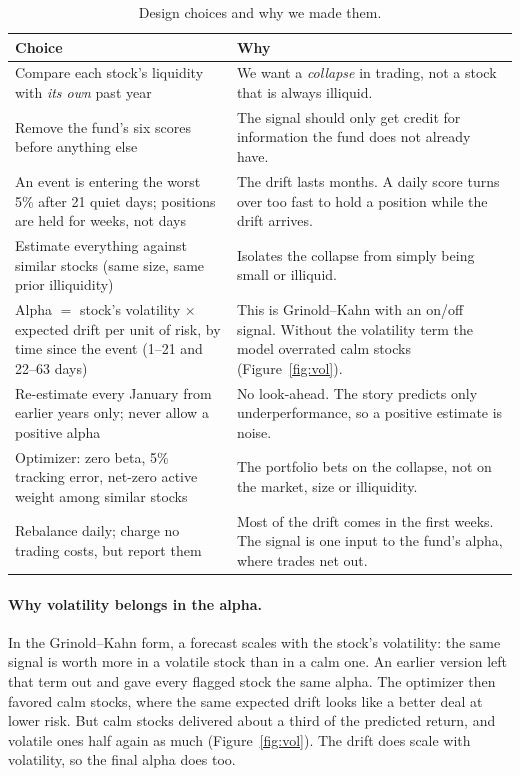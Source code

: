 \documentclass[11pt]{article}
\begin{document}
\begin{table}[H]
\centering
\caption{Design choices and why we made them.}\label{tab:choices}
\small
\begin{tabularx}{\textwidth}{p{}X}
\toprule
Choice & Why \\
\midrule
Compare each stock's liquidity with \emph{its own} past year &
  We want a \emph{collapse} in trading, not a stock that is always illiquid. \\
Remove the fund's six scores before anything else &
  The signal should only get credit for information the fund does not already have. \\
An event is entering the worst 5\% after 21 quiet days; positions are held for weeks, not days &
  The drift lasts months. A daily score turns over too fast to hold a position while the drift arrives. \\
Estimate everything against similar stocks (same size, same prior illiquidity) &
  Isolates the collapse from simply being small or illiquid. \\
Alpha $=$ stock's volatility $\times$ expected drift per unit of risk, by time since the event (1--21 and 22--63 days) &
  This is Grinold--Kahn with an on/off signal. Without the volatility term the model overrated calm stocks (Figure~\ref{fig:vol}). \\
Re-estimate every January from earlier years only; never allow a positive alpha &
  No look-ahead. The story predicts only underperformance, so a positive estimate is noise. \\
Optimizer: zero beta, 5\% tracking error, net-zero active weight among similar stocks &
  The portfolio bets on the collapse, not on the market, size or illiquidity. \\
Rebalance daily; charge no trading costs, but report them &
  Most of the drift comes in the first weeks. The signal is one input to the fund's alpha, where trades net out. \\
\bottomrule
\end{tabularx}
\end{table}

\paragraph{Why volatility belongs in the alpha.} In the Grinold--Kahn form, a forecast scales with the stock's volatility:
the same signal is worth more in a volatile stock than in a calm one. An earlier version left that term out and gave every
flagged stock the same alpha. The optimizer then favored calm stocks, where the same expected drift looks like a better deal
at lower risk. But calm stocks delivered about a third of the predicted return, and volatile ones half again as much
(Figure~\ref{fig:vol}). The drift does scale with volatility, so the final alpha does too.
\end{document}
